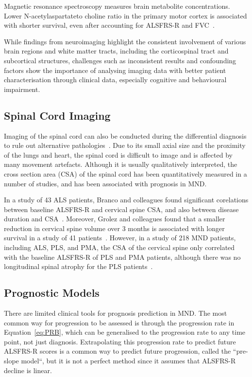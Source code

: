 Magnetic resonance spectroscopy measures brain metabolite concentrations.
Lower N-acetylaspartateto choline ratio in the primary motor cortex is associated with shorter survival, even after accounting for ALSFRS-R and FVC~\cite{kalraCerebralDegenerationPredicts2006}.

While findings from neuroimaging highlight the consistent involvement of various brain regions and white matter tracts, including the corticospinal tract and subcortical structures, challenges such as inconsistent results and confounding factors show the importance of analysing imaging data with better patient characterisation through clinical data, especially cognitive and behavioural impairment.

\subsection{Spinal Cord Imaging}

Imaging of the spinal cord can also be conducted during the differential diagnosis to rule out alternative pathologies~\cite{elmendiliSpinalCordImaging2019}.
Due to its small axial size and the proximity of the lungs and heart, the spinal cord is difficult to image and is affected by many movement artefacts.
Although it is usually qualitatively interpreted, the cross section area (CSA) of the spinal cord has been quantitatively measured in a number of studies, and has been associated with prognosis in MND.

In a study of 43 ALS patients, Branco and colleagues found significant corelations between baseline ALSFRS-R and cervical spine CSA, and also between disease duration and CSA~\cite{brancoSpinalCordAtrophy2014}.
Moreover, Grolez and colleagues found that a smaller reduction in cervical spine volume over 3 months is associated with longer survival in a study of 41 patients~\cite{grolezMRICervicalSpinal2018}.
However, in a study of 218 MND patients, including ALS, PLS, and PMA, the CSA of the cervical spine only correlated with the baseline ALSFRS-R of PLS and PMA patients, although there was no longitudinal spinal atrophy for the PLS patients~\cite{vanderburghCrosssectionalLongitudinalAssessment2019}.


\subsection{Prognostic Models}
There are limited clinical tools for prognosis prediction in MND. The most common way for progression to be assessed is through the progression rate in Equation~\ref{eq:PRB}, which can be generalised to the progression rate to any time point, not just diagnosis.
Extrapolating this progression rate to predict future ALSFRS-R scores is a common way to predict future progression, called the ``pre-slope model``, but it is not a perfect method since it assumes that ALSFRS-R decline is linear.

